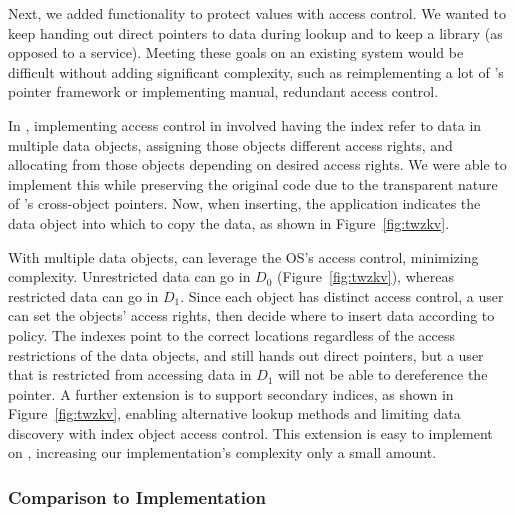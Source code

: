 Next, we added functionality to protect values with access control. We wanted to
keep handing out direct pointers to data during lookup and to
keep \nvkv a library (as opposed to a service). Meeting these goals on an
existing system would be difficult without adding significant
complexity, such as reimplementing a lot of \Twizzler's pointer framework or implementing manual,
redundant access control.

In \Twizzler, implementing access control in \nvkv involved having the index refer to data in
multiple data objects, assigning those objects different access rights, and allocating from
those objects depending on desired access rights. We were
able to implement this while preserving the original code due to the
transparent nature of \Twizzler's cross-object pointers. Now, when inserting, the application
indicates the data object into which to copy the data, as shown in Figure~\ref{fig:twzkv}.

With multiple data objects, \nvkv can leverage the OS's access control,
minimizing complexity. Unrestricted data can go in $D_0$ (Figure~\ref{fig:twzkv}),
whereas restricted data can go in $D_1$. Since each object has distinct
access control, a user can set the objects' access rights, then decide
where to insert data according to policy. The indexes point to the
correct locations regardless of the access restrictions of the data objects, and \nvkv still hands
out direct pointers, but a user that is restricted from accessing data in $D_1$ will not
be able to dereference the pointer. A further extension is to support secondary indices, as shown in
Figure~\ref{fig:twzkv}, enabling alternative lookup methods and limiting data discovery
with index object access control. This extension is easy to implement on \Twizzler,
increasing our implementation's complexity only a small amount.

\subsubsection{Comparison to \unix Implementation}


